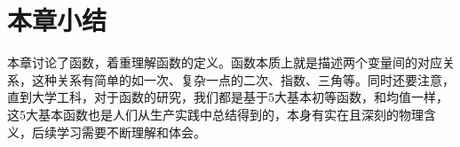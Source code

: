 \section{本章小结}

本章讨论了函数，着重理解函数的定义。函数本质上就是描述两个变量间的对应关系，这种关系有简单的如一次、复杂一点的二次、指数、三角等。同时还要注意，直到大学工科，对于函数的研究，我们都是基于5大基本初等函数，和均值一样，这5大基本函数也是人们从生产实践中总结得到的，本身有实在且深刻的物理含义，后续学习需要不断理解和体会。




